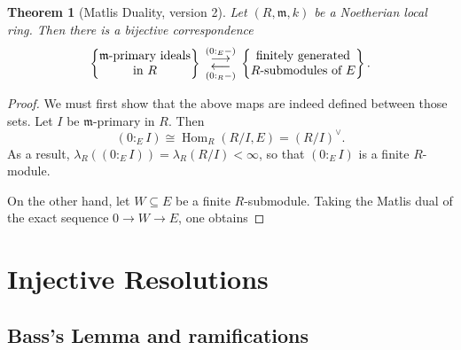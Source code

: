 \documentclass[10pt]{article}
\theoremstyle{thmstyle}
\newtheorem{theorem}{Theorem}[section]
\theoremstyle{defstyle}
\newcommand{\Hom}{\operatorname{Hom}}
\newcommand{\frakm}{\mathfrak{m}} %
\begin{document}
\begin{theorem}[Matlis Duality, version 2]
    Let $(R,\frakm,k)$ be a Noetherian local ring. Then there is a bijective correspondence
    \begin{equation*}
        \left\{
        \begin{tabular}{@{} c @{}}
            $\frakm$-primary ideals\\
            in $R$ 
        \end{tabular}
        \right\}
        \;
        \begin{gathered}
            \overset{\left(0 :_E -\right)}{\longrightarrow}\\[-2ex]
            \underset{\left(0 :_R -\right)}{\longleftarrow}
        \end{gathered}
        \;
        \left\{
        \begin{tabular}{@{} c @{}}
            finitely generated\\
            $R$-submodules of $E$
        \end{tabular}
        \right\}.
    \end{equation*}
\end{theorem}
\begin{proof}
    We must first show that the above maps are indeed defined between those sets. Let $I$ be $\frakm$-primary in $R$. Then 
    \begin{equation*}
        \left(0 :_E I\right)\cong\Hom_R\left(R/I, E\right) = \left(R/I\right)^\vee.
    \end{equation*}
    As a result, $\lambda_R\left(\left(0 :_E I\right)\right) = \lambda_R(R/I) < \infty$, so that $(0:_E I)$ is a finite $R$-module. 

    On the other hand, let $W\subseteq E$ be a finite $R$-submodule. Taking the Matlis dual of the exact sequence $0\to W\to E$, one obtains 
\end{proof}

\section{Injective Resolutions}

\subsection{Bass's Lemma and ramifications}
\end{document}
